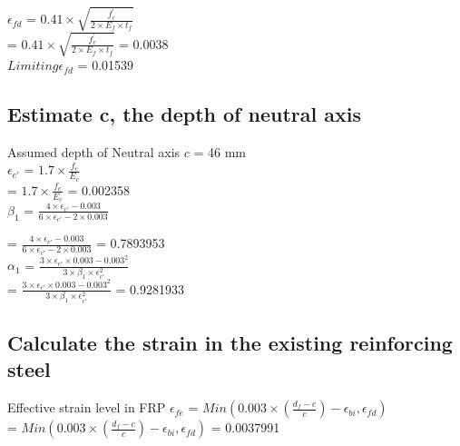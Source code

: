 \documentclass[12pt,a4paper]{article} %
\newcommand{\tab}{\hspace*{2em}} %
\begin{document}
\tab\tab\tab\tab\tab  $\epsilon_{fd}$ = ${0.41 \times \sqrt{\frac{f_c^{'} }{ 2 \times E_f \times t_f}} } $ \\[8pt] 

\tab\tab\tab\tab\tab  = ${0.41 \times \sqrt{\frac{f_c^{'} }{ 2 \times E_f \times t_f}} } $ = 0.0038 \\[8pt] 

\tab\tab\tab\tab\tab $Limiting \epsilon_{fd}$ = 0.01539

\subsection{Estimate c, the depth of neutral axis} 

\tab Assumed depth of Neutral axis  $c$ = 46 mm 
  \\[8pt] 

\tab $\epsilon_{c'}$ =  ${1.7 \times \frac{f_c}{E_c}}$ \\[8pt] 

\tab\tab\tab\tab\tab =  ${1.7 \times \frac{f_c}{E_c}}$ = 0.002358 \\[8pt]

\tab $\beta_{1}$ = $\frac{4 \times \epsilon_{c'} - 0.003}{6 \times \epsilon_{c'}-{2 \times 0.003 }}$

\tab\tab\tab\tab\tab = $\frac{4 \times \epsilon_{c'} - 0.003}{6 \times \epsilon_{c'}-{2 \times 0.003 }}$ = 0.7893953 \\[8pt]

\tab $\alpha_{1}$ = $\frac{3 \times \epsilon_{c'} \times 0.003 - 0.003^2}{3 \times \beta_{1} \times \epsilon_{c'}^2}$ \\[8pt]

\tab\tab\tab\tab\tab = $\frac{3 \times \epsilon_{c'} \times 0.003 - 0.003^2}{3 \times \beta_{1} \times \epsilon_{c'}^2}$ = 0.9281933 \\[8pt]

\subsection{Calculate the strain in the existing reinforcing steel} 

\tab Effective strain level in FRP $\epsilon_{fe}$ = $Min (0.003 \times (\frac{d_f-c}{c}) - \epsilon_{bi},  \epsilon_{fd})$ \\[8pt]

\tab\tab\tab\tab\tab = $Min (0.003 \times (\frac{d_f-c}{c}) - \epsilon_{bi},  \epsilon_{fd})$ = 0.0037991 \\[8pt]
\end{document}
